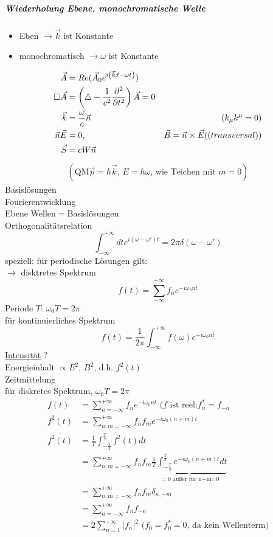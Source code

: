 \documentclass[a4paper]{article}
\newcommand*\laplace{\mathop{}\!\mathbin\bigtriangleup}
\newcommand*\dalembert{\mathop{}\!\mathbin\Box}
\begin{document}
\subparagraph{Wiederholung Ebene, monochromatische Welle}
\begin{itemize}
  \item Eben $\rightarrow \vec{k}$ ist Konstante
  \item monochromatisch $\rightarrow \omega$ ist Konstante
\end{itemize}
\begin{align}
\vec{A}&=Re(\vec{A}_0 e^{i\left(\vec{k}\vec{x}-\omega t\right)})\\
\dalembert \vec{A}&=\left( \laplace -\frac{1}{c^2}\frac{\partial^2}{\partial
t^2} \right)\vec{A}=0\\
\vec{k}&=\frac{\omega}{c}\vec{n} &\left( k_\mu k^\mu=0 \right)\\
\vec{n}\vec{E}&=0, &\vec{B}=\vec{n}\times\vec{E} \text(  (transversal))\\
\vec{S}&=cW\vec{n}
\end{align}
\begin{align}
\left( \text{QM} \vec{p}=\hbar\vec{k}\text{, }E=\hbar\omega \text{, wie Teichen
mit }m=0 \right)
\end{align}
Basislösungen\\
Fourierentwicklung\\
Ebene Wellen$=$Basislösungen\\
Orthogonalitätsrelation
\begin{equation}
\int_{-\infty}^{+\infty} dt e^{i(\omega-\omega')t}=2\pi\delta(\omega-\omega')
\end{equation}
speziell: für periodische Lösungen gilt:\\
$\rightarrow$ disktretes Spektrum
\begin{equation}
f(t)=\sum_{-\infty}^{+\infty} f_n  e^{-i\omega_0 n t}
\end{equation}
Periode $T$: $\omega_0 T=2\pi$\\
für kontinuierliches Spektrum
\begin{equation}
f(t)=\frac{1}{2\pi}\int_{-\infty}^{+\infty} f(\omega)  e^{-i\omega_0 n t}
\end{equation} 
\underline{Intensität} ?\\
Energieinhalt $\propto E^2$, $B^2$, d.h. $f^2(t)$\\
Zeitmittelung\\
für diskretes Spektrum, $\omega_0 T=2\pi$
\begin{align}
f(t)&=\sum_{n=-\infty}^{+\infty} f_n  e^{-i\omega_0 n t} \text{  (}f \text{ ist
reel:}f_n^*=f_{-n}\\
f^2(t)&=\sum_{n,m=-\infty}^{+\infty} f_n f_m  e^{-i\omega_0 (n+m) t}\\
\overline{f^2(t)}&=\frac{1}{T} \int_{-\frac{T}{2}}^{\frac{T}{2}} f^2(t) dt\\
&=\sum_{n,m=-\infty}^{+\infty} f_n f_m \underbrace{\frac{1}{T}
\int_{-\frac{T}{2}}^{\frac{T}{2}} e^{-i\omega_0 (n+m) t}dt}_{=0 \text{ außer
für n+m=0}}\\
&=\sum_{n,m=-\infty}^{+\infty} f_n f_m \delta_{n,-m}\\
&=\sum_{n=-\infty}^{+\infty} f_n f_{-n}\\
&=2\sum_{n=1}^{+\infty} |f_n|^2 \text{ (} f_0=f_0^*=0\text{, da kein
Wellenterm)}
\end{align}
\end{document}
